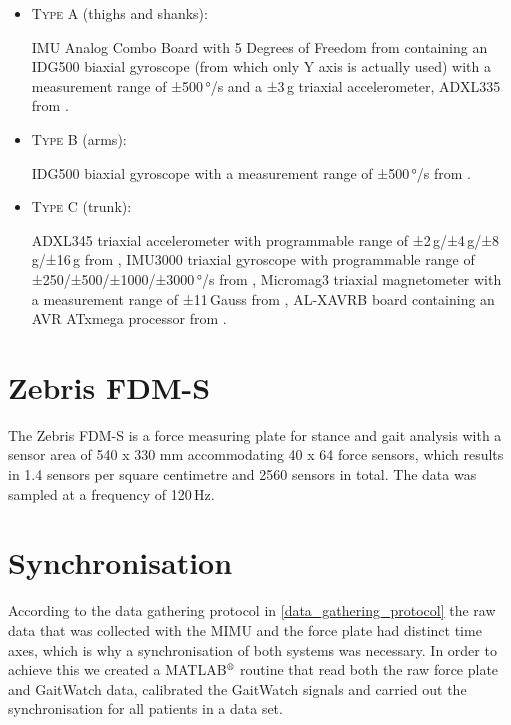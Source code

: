 \begin{itemize}

\item \textsc{Type A} (thighs and shanks): 

IMU Analog Combo Board with 5 Degrees of Freedom from  \cite{IMU5} containing an IDG500 biaxial gyroscope (from which only Y axis is actually used) with a measurement range of ±500\,°/s \cite{IDG500} and a ±3\,g triaxial accelerometer, ADXL335 from  \cite{ADXL335}.

\item \textsc{Type B} (arms):

IDG500 biaxial gyroscope with a measurement range of ±500\,°/s from  \cite{IDG500}.

\item \textsc{Type C} (trunk):

ADXL345 triaxial accelerometer with programmable range of ±2\,g/±4\,g/±8\,g/±16\,g from  \cite{ADXL345},
IMU3000 triaxial gyroscope with programmable range of ±250/±500/±1000/±3000\,°/s from  \cite{IMU3000}, 
Micromag3 triaxial magnetometer with a measurement range of ±11\,Gauss from  \cite{MicroMag3}, AL-XAVRB board containing an AVR ATxmega processor from  \cite{AVRATxmega}.

\end{itemize}


\section{Zebris FDM-S}

The Zebris FDM-S \cite{zebris_force_plate_2013} is a force measuring plate for stance and gait analysis with a sensor area of 540 x 330 mm accommodating 40 x 64 force sensors, which results in 1.4 sensors per square centimetre and 2560 sensors in total. The data was sampled at a frequency of 120\,Hz.

\section{Synchronisation}

According to the data gathering protocol in \ref{data_gathering_protocol} the raw data that was collected with the MIMU and the force plate had distinct time axes, which is why a synchronisation of both systems was necessary. In order to achieve this we created a MATLAB$\textsuperscript{\textregistered}$ routine that read both the raw force plate and GaitWatch data, calibrated the GaitWatch signals and carried out the synchronisation for all patients in a data set.

